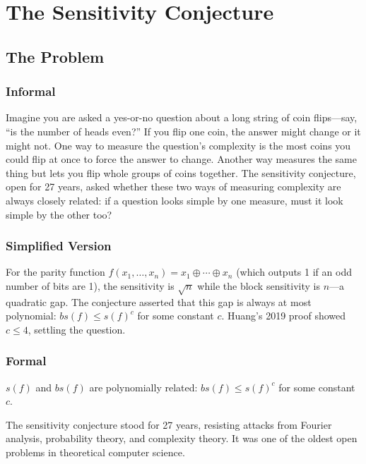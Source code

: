 \let\LocalMacro\relax

\chapter{The Sensitivity Conjecture}

\section{The Problem}

\subsection{Informal}
Imagine you are asked a yes-or-no question about a long string of coin flips---say, ``is the number of heads even?'' If you flip one coin, the answer might change or it might not. One way to measure the question's complexity is the most coins you could flip at once to force the answer to change. Another way measures the same thing but lets you flip whole groups of coins together. The sensitivity conjecture, open for 27 years, asked whether these two ways of measuring complexity are always closely related: if a question looks simple by one measure, must it look simple by the other too?

\subsection{Simplified Version}
For the parity function $f(x_1, \ldots, x_n) = x_1 \oplus \cdots \oplus x_n$ (which outputs 1 if an odd number of bits are 1), the sensitivity is $\sqrt{n}$ while the block sensitivity is $n$---a quadratic gap. The conjecture asserted that this gap is always at most polynomial: $bs(f) \le s(f)^c$ for some constant $c$. Huang's 2019 proof showed $c \le 4$, settling the question.

\subsection{Formal}
\begin{conjecture}
$s(f)$ and $bs(f)$ are polynomially related: $bs(f) \le s(f)^c$ for some constant $c$.
\end{conjecture}

\begin{historicalbox}
The sensitivity conjecture stood for 27 years, resisting attacks from Fourier analysis, probability theory, and complexity theory. It was one of the oldest open problems in theoretical computer science.
\end{historicalbox}

